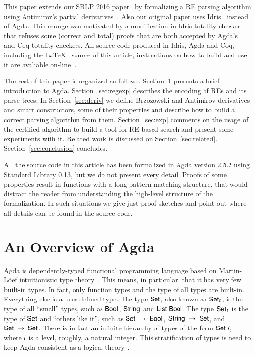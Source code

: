 \documentclass[review]{elsarticle}
\newcommand{\D}[1]{\blue{\mathsf{#1}}}
\newcommand{\V}[1]{\purple{\mathit{#1}}}
\begin{document}
This paper extends our SBLP 2016 paper~\cite{Lopes2016} by formalizing
a RE parsing algorithm using Antimirov's partial derivatives~\cite{Antimirov1996}.
Also our original paper uses Idris~\cite{Brady2013} instead of Agda. This change
was motivated by a modification in Idris totality checker that refuses some
(correct and total) proofs that are both accepted by Agda's and Coq totality
checkers. All source code produced in Idris, Agda and Coq, including the \LaTeX~
source of this article, instructions on how to build and use it are avaliable
on-line~\cite{regex-rep}.

The rest of this paper is organized as
follows. Section~\ref{sec:agda} presents a brief introduction to
Agda. Section~\ref{sec:regexp} describes the encoding of REs and its
parse trees. In Section~\ref{sec:deriv} we define Brzozowski and Antimirov
derivatives and smart constructors, some of their properties and describe
how to build a correct parsing algorithm from them. Section~\ref{sec:exp}
comments on the usage of the certified algorithm to build a tool for RE-based
search and present some experiments with it. Related work is discussed
on Section~\ref{sec:related}. Section~\ref{sec:conclusion} concludes.

All the source code in this article has been formalized in Agda
version 2.5.2 using Standard Library 0.13, but
we do not present every detail. Proofs of some properties result in
functions with a long pattern matching structure, that would distract
the reader from understanding the high-level structure of the
formalization. In such situations we give just proof sketches and point
out where all details can be found in the source code.

\section{An Overview of Agda}\label{sec:agda}


Agda is dependently-typed functional programming language based on Martin-L\"oef
intuitionistic type theory~\cite{Lof98}. This means, in particular, that it has
very few built-in types. In fact, only function types and the type of all types
are built-in. Everything else is a user-defined type. The type \ensuremath{\D{Set}}, also known
as \ensuremath{\D{Set}_{\D{0}}}, is the type of all ``small'' types, such as \ensuremath{\D{Bool}}, \ensuremath{\D{String}} and \ensuremath{\D{List}\;\D{Bool}}.
The type \ensuremath{\D{Set}_{\D{1}}} is the type of \ensuremath{\D{Set}} and ``others like it'', such as \ensuremath{\D{Set}\;\to \;\D{Bool}},
\ensuremath{\D{String}\;\to \;\D{Set}}, and \ensuremath{\D{Set}\;\to \;\D{Set}}. There is in fact an infinite hierarchy of types of the
form \ensuremath{\D{Set}\;\V{l}}, where \ensuremath{\V{l}} is a level, roughly, a natural integer. This stratification
of types is need to keep Agda consistent as a logical theory~\cite{Sorensen2006}.
\end{document}
